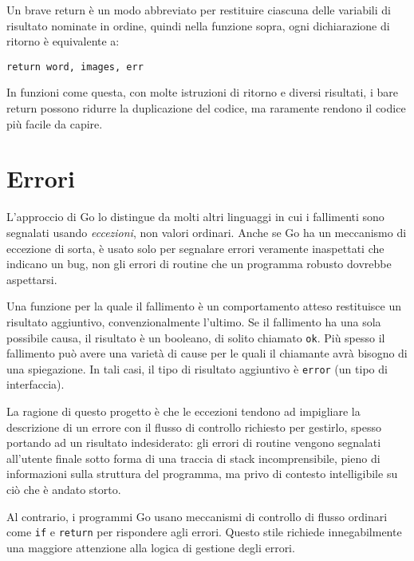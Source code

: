 Un brave return è un modo abbreviato per restituire ciascuna delle variabili di risultato nominate in ordine, quindi nella funzione sopra, ogni dichiarazione di ritorno è equivalente a:
\begin{lstlisting}[frame=single, label={lst:lstlisting4-3.6}]
return word, images, err
\end{lstlisting}
In funzioni come questa, con molte istruzioni di ritorno e diversi risultati, i bare return possono ridurre la duplicazione del codice, ma raramente rendono il codice più facile da capire.


\section{Errori}
\label{sec:errori}%
L'approccio di Go lo distingue da molti altri linguaggi in cui i fallimenti sono segnalati usando \textit{eccezioni}, non valori ordinari.
Anche se Go ha un meccanismo di eccezione di sorta, è usato solo per segnalare errori veramente inaspettati che indicano un bug, non gli errori di routine che un programma robusto dovrebbe aspettarsi.

Una funzione per la quale il fallimento è un comportamento atteso restituisce un risultato aggiuntivo, convenzionalmente l'ultimo.
Se il fallimento ha una sola possibile causa, il risultato è un booleano, di solito chiamato \verb|ok|.
Più spesso il fallimento può avere una varietà di cause per le quali il chiamante avrà bisogno di una spiegazione.
In tali casi, il tipo di risultato aggiuntivo è \verb|error| (un tipo di interfaccia).

La ragione di questo progetto è che le eccezioni tendono ad impigliare la descrizione di un errore con il flusso di controllo richiesto per gestirlo, spesso portando ad un risultato indesiderato: gli errori di routine vengono segnalati all'utente finale sotto forma di una traccia di stack incomprensibile, pieno di informazioni sulla struttura del programma, ma privo di contesto intelligibile su ciò che è andato storto.

Al contrario, i programmi Go usano meccanismi di controllo di flusso ordinari come \verb|if| e \verb|return| per rispondere agli errori.
Questo stile richiede innegabilmente una maggiore attenzione alla logica di gestione degli errori.


